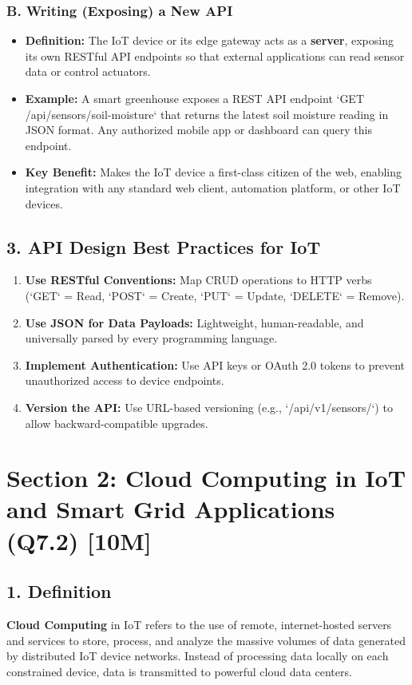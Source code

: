 \subsubsection{B. Writing (Exposing) a New API}
\begin{itemize}
  \item   \textbf{Definition:} The IoT device or its edge gateway acts as a \textbf{server}, exposing its own RESTful API endpoints so that external applications can read sensor data or control actuators.
  \item   \textbf{Example:} A smart greenhouse exposes a REST API endpoint `GET /api/sensors/soil-moisture` that returns the latest soil moisture reading in JSON format. Any authorized mobile app or dashboard can query this endpoint.
  \item   \textbf{Key Benefit:} Makes the IoT device a first-class citizen of the web, enabling integration with any standard web client, automation platform, or other IoT devices.
\end{itemize}


\subsection{3. API Design Best Practices for IoT}
\begin{enumerate}
  \item \textbf{Use RESTful Conventions:} Map CRUD operations to HTTP verbs (`GET` = Read, `POST` = Create, `PUT` = Update, `DELETE` = Remove).
  \item \textbf{Use JSON for Data Payloads:} Lightweight, human-readable, and universally parsed by every programming language.
  \item \textbf{Implement Authentication:} Use API keys or OAuth 2.0 tokens to prevent unauthorized access to device endpoints.
  \item \textbf{Version the API:} Use URL-based versioning (e.g., `/api/v1/sensors/`) to allow backward-compatible upgrades.
\end{enumerate}


\section{Section 2: Cloud Computing in IoT and Smart Grid Applications (Q7.2) [10M]}

\subsection{1. Definition}
\textbf{Cloud Computing} in IoT refers to the use of remote, internet-hosted servers and services to store, process, and analyze the massive volumes of data generated by distributed IoT device networks. Instead of processing data locally on each constrained device, data is transmitted to powerful cloud data centers.


